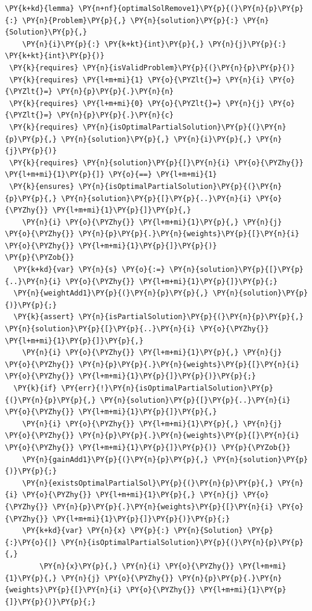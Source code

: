 \begin{sloppypar}
\begin{enumerate}
\begin{Verbatim}[commandchars=\\\{\}]
\PY{k+kd}{lemma} \PY{n+nf}{optimalSolRemove1}\PY{p}{(}\PY{n}{p}\PY{p}{:} \PY{n}{Problem}\PY{p}{,} \PY{n}{solution}\PY{p}{:} \PY{n}{Solution}\PY{p}{,} 
    \PY{n}{i}\PY{p}{:} \PY{k+kt}{int}\PY{p}{,} \PY{n}{j}\PY{p}{:} \PY{k+kt}{int}\PY{p}{)}
 \PY{k}{requires} \PY{n}{isValidProblem}\PY{p}{(}\PY{n}{p}\PY{p}{)}
 \PY{k}{requires} \PY{l+m+mi}{1} \PY{o}{\PYZlt{}=} \PY{n}{i} \PY{o}{\PYZlt{}=} \PY{n}{p}\PY{p}{.}\PY{n}{n}
 \PY{k}{requires} \PY{l+m+mi}{0} \PY{o}{\PYZlt{}=} \PY{n}{j} \PY{o}{\PYZlt{}=} \PY{n}{p}\PY{p}{.}\PY{n}{c}
 \PY{k}{requires} \PY{n}{isOptimalPartialSolution}\PY{p}{(}\PY{n}{p}\PY{p}{,} \PY{n}{solution}\PY{p}{,} \PY{n}{i}\PY{p}{,} \PY{n}{j}\PY{p}{)}
 \PY{k}{requires} \PY{n}{solution}\PY{p}{[}\PY{n}{i} \PY{o}{\PYZhy{}} \PY{l+m+mi}{1}\PY{p}{]} \PY{o}{==} \PY{l+m+mi}{1}
 \PY{k}{ensures} \PY{n}{isOptimalPartialSolution}\PY{p}{(}\PY{n}{p}\PY{p}{,} \PY{n}{solution}\PY{p}{[}\PY{p}{..}\PY{n}{i} \PY{o}{\PYZhy{}} \PY{l+m+mi}{1}\PY{p}{]}\PY{p}{,} 
    \PY{n}{i} \PY{o}{\PYZhy{}} \PY{l+m+mi}{1}\PY{p}{,} \PY{n}{j} \PY{o}{\PYZhy{}} \PY{n}{p}\PY{p}{.}\PY{n}{weights}\PY{p}{[}\PY{n}{i} \PY{o}{\PYZhy{}} \PY{l+m+mi}{1}\PY{p}{]}\PY{p}{)}
\PY{p}{\PYZob{}}
  \PY{k+kd}{var} \PY{n}{s} \PY{o}{:=} \PY{n}{solution}\PY{p}{[}\PY{p}{..}\PY{n}{i} \PY{o}{\PYZhy{}} \PY{l+m+mi}{1}\PY{p}{]}\PY{p}{;}
  \PY{n}{weightAdd1}\PY{p}{(}\PY{n}{p}\PY{p}{,} \PY{n}{solution}\PY{p}{)}\PY{p}{;}
  \PY{k}{assert} \PY{n}{isPartialSolution}\PY{p}{(}\PY{n}{p}\PY{p}{,} \PY{n}{solution}\PY{p}{[}\PY{p}{..}\PY{n}{i} \PY{o}{\PYZhy{}} \PY{l+m+mi}{1}\PY{p}{]}\PY{p}{,} 
    \PY{n}{i} \PY{o}{\PYZhy{}} \PY{l+m+mi}{1}\PY{p}{,} \PY{n}{j} \PY{o}{\PYZhy{}} \PY{n}{p}\PY{p}{.}\PY{n}{weights}\PY{p}{[}\PY{n}{i} \PY{o}{\PYZhy{}} \PY{l+m+mi}{1}\PY{p}{]}\PY{p}{)}\PY{p}{;}
  \PY{k}{if} \PY{err}{!}\PY{n}{isOptimalPartialSolution}\PY{p}{(}\PY{n}{p}\PY{p}{,} \PY{n}{solution}\PY{p}{[}\PY{p}{..}\PY{n}{i} \PY{o}{\PYZhy{}} \PY{l+m+mi}{1}\PY{p}{]}\PY{p}{,} 
    \PY{n}{i} \PY{o}{\PYZhy{}} \PY{l+m+mi}{1}\PY{p}{,} \PY{n}{j} \PY{o}{\PYZhy{}} \PY{n}{p}\PY{p}{.}\PY{n}{weights}\PY{p}{[}\PY{n}{i} \PY{o}{\PYZhy{}} \PY{l+m+mi}{1}\PY{p}{]}\PY{p}{)} \PY{p}{\PYZob{}}
    \PY{n}{gainAdd1}\PY{p}{(}\PY{n}{p}\PY{p}{,} \PY{n}{solution}\PY{p}{)}\PY{p}{;}
    \PY{n}{existsOptimalPartialSol}\PY{p}{(}\PY{n}{p}\PY{p}{,} \PY{n}{i} \PY{o}{\PYZhy{}} \PY{l+m+mi}{1}\PY{p}{,} \PY{n}{j} \PY{o}{\PYZhy{}} \PY{n}{p}\PY{p}{.}\PY{n}{weights}\PY{p}{[}\PY{n}{i} \PY{o}{\PYZhy{}} \PY{l+m+mi}{1}\PY{p}{]}\PY{p}{)}\PY{p}{;}
    \PY{k+kd}{var} \PY{n}{x} \PY{p}{:} \PY{n}{Solution} \PY{p}{:}\PY{o}{|} \PY{n}{isOptimalPartialSolution}\PY{p}{(}\PY{n}{p}\PY{p}{,} 
        \PY{n}{x}\PY{p}{,} \PY{n}{i} \PY{o}{\PYZhy{}} \PY{l+m+mi}{1}\PY{p}{,} \PY{n}{j} \PY{o}{\PYZhy{}} \PY{n}{p}\PY{p}{.}\PY{n}{weights}\PY{p}{[}\PY{n}{i} \PY{o}{\PYZhy{}} \PY{l+m+mi}{1}\PY{p}{]}\PY{p}{)}\PY{p}{;}

\end{Verbatim}
\end{enumerate}
\end{sloppypar}
